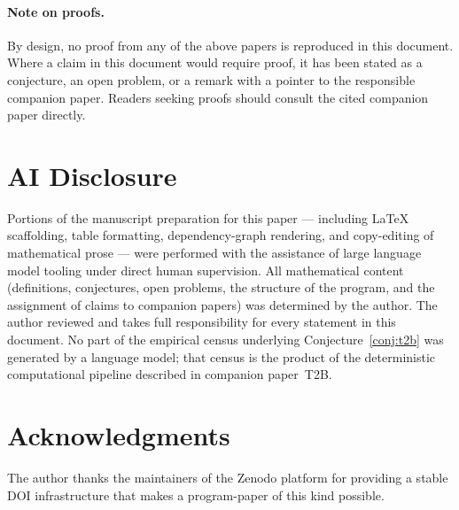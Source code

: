 \documentclass[11pt,a4paper]{article}
\theoremstyle{definition}
\theoremstyle{remark}
\begin{document}
\paragraph{Note on proofs.}
By design, no proof from any of the above papers is reproduced in this
document. Where a claim in this document would require proof, it has
been stated as a conjecture, an open problem, or a remark with a pointer
to the responsible companion paper. Readers seeking proofs should
consult the cited companion paper directly.

\section{AI Disclosure}
\label{sec:ai}

Portions of the manuscript preparation for this paper --- including
LaTeX scaffolding, table formatting, dependency-graph rendering, and
copy-editing of mathematical prose --- were performed with the
assistance of large language model tooling under direct human
supervision. All mathematical content (definitions, conjectures, open
problems, the structure of the program, and the assignment of claims to
companion papers) was determined by the author. The author reviewed and
takes full responsibility for every statement in this document. No part
of the empirical census underlying Conjecture~\ref{conj:t2b} was
generated by a language model; that census is the product of the
deterministic computational pipeline described in companion paper~T2B.

\section*{Acknowledgments}
The author thanks the maintainers of the Zenodo platform for providing
a stable DOI infrastructure that makes a program-paper of this kind
possible.
\end{document}
